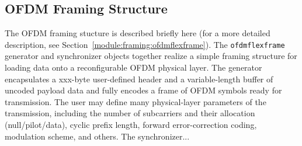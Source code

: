 %
%
\subsection{OFDM Framing Structure}
\label{tutorial:ofdmflexframe:structure}
%
The OFDM framing stucture is described briefly here
(for a more detailed description, see
Section~\ref{module:framing:ofdmflexframe}).
The {\tt ofdmflexframe} generator and synchronizer objects
together realize a simple framing structure
for loading data onto a reconfigurable OFDM physical layer.
The generator encapsulates a xxx-byte user-defined header
and a variable-length buffer of uncoded payload data
and fully encodes a frame of OFDM symbols ready for transmission.
The user may define many physical-layer parameters of the transmission,
including
  the number of subcarriers and their allocation (null/pilot/data),
  cyclic prefix length,
  forward error-correction coding,
  modulation scheme,
  and others.
The synchronizer...

%
%
